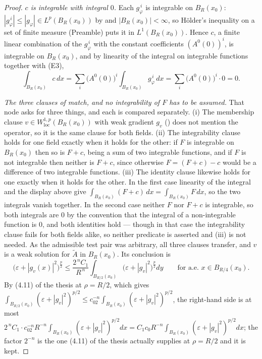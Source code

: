 \begin{proof}
\emph{$c$ is integrable with integral $0$.}  Each $g_\varphi^{\,i}$ is
integrable on $B_R(x_0)$: $|g_\varphi^{\,i}|\le|g_\varphi|\in L^p(B_R(x_0))$ by
 and $|B_R(x_0)|<\infty$, so H\"older's inequality on a set of
finite measure (Preamble) puts it in $L^1(B_R(x_0))$.  Hence $c$, a finite
linear combination of the $g_\varphi^{\,i}$ with the constant coefficients
$(A^0(0))^i$, is integrable on $B_R(x_0)$, and by linearity of the integral on
integrable functions together with (E3),
\[
\int_{B_R(x_0)}c\,dx=\sum_i\bigl(A^0(0)\bigr)^i\int_{B_R(x_0)}g_\varphi^{\,i}\,dx
=\sum_i\bigl(A^0(0)\bigr)^i\cdot0=0 .
\]

\emph{The three clauses of  match, and no
integrability of $F$ has to be assumed.}  That node asks for three things, and
each is compared separately.  (i) The membership clause
$v\in W^{1,p}_{\mathrm{loc}}(B_R(x_0))$ with weak gradient $g_v$
() does not mention the operator, so it is the same clause
for both fields.  (ii) The integrability clause holds for one field exactly when
it holds for the other: if $F$ is integrable on $B_R(x_0)$ then so is $F+c$,
being a sum of two integrable functions, and if $F$ is not integrable then
neither is $F+c$, since otherwise $F=(F+c)-c$ would be a difference of two
integrable functions.  (iii) The identity clause likewise holds for one exactly
when it holds for the other.  In the first case linearity of the integral and
the display above give
$\int_{B_R(x_0)}(F+c)\,dx=\int_{B_R(x_0)}F\,dx$, so the two integrals vanish
together.  In the second case neither $F$ nor $F+c$ is integrable, so both
integrals are $0$ by the convention that the integral of a non-integrable
function is $0$, and both identities hold --- though in that case the
integrability clause fails for both fields alike, so neither predicate is
asserted and (iii) is not needed.  As the admissible test pair was arbitrary,
all three clauses transfer, and $v$ is a weak solution for $\widetilde A$ in
$B_R(x_0)$.  Its conclusion is
\[
\bigl(\varepsilon+|g_v(x)|^2\bigr)^{\frac p2}
\le\frac{2^{\,n}C_1}{R^{\,n}}\int_{B_{R/2}(x_0)}\bigl(\varepsilon+|g_v|^2\bigr)^{\frac p2}dy
\qquad\text{for a.e. }x\in B_{R/4}(x_0).
\]
By (4.11) of the thesis at $\rho=R/2$, which gives
$\int_{B_{R/2}(x_0)}(\varepsilon+|g_v|^2)^{p/2}\le c_02^{-n}
\int_{B_R(x_0)}(\varepsilon+|g_v|^2)^{p/2}$, the right-hand side is at most
$2^{\,n}C_1\cdot c_02^{-n}R^{-n}\int_{B_R(x_0)}(\varepsilon+|g_v|^2)^{p/2}dx
=C_1c_0R^{-n}\int_{B_R(x_0)}(\varepsilon+|g_v|^2)^{p/2}dx$; the factor $2^{-n}$
is the one (4.11) of the thesis actually supplies at $\rho=R/2$ and it is kept.


\end{proof}
